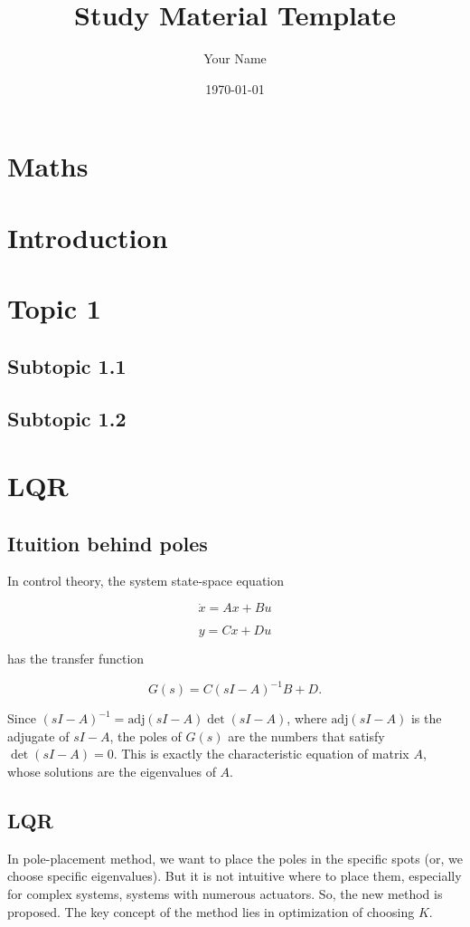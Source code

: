 \documentclass{article}
\title{Study Material Template}
\author{Your Name}
\date{\today}
\begin{document}
\maketitle

\tableofcontents
\newpage


\section{Maths}

\section{Introduction}

\section{Topic 1}
\subsection{Subtopic 1.1}

\subsection{Subtopic 1.2}

\section{LQR}

\subsection{Ituition behind poles}
In control theory, the system state-space equation

\[\dot{x} = Ax+Bu\]

\[y=Cx+Du\]

has the transfer function

\[G(s)=C(sI-A)^{-1}B+D.\]

Since \((sI-A)^{-1}=\text{adj}(sI-A)\det(sI-A)\), where \(\text{adj}(sI-A)\) is the adjugate of \(sI-A\), the poles of \(G(s)\) are the numbers that satisfy \(\det(sI-A)=0\). This is exactly the characteristic equation of matrix \(A\), whose solutions are the eigenvalues of \(A\).

\subsection{LQR}
In pole-placement method, we want to place the poles in the specific spots (or, we choose specific eigenvalues). But it is not intuitive where to place them, especially for complex systems, systems with numerous actuators.
So, the new method is proposed. The key concept of the method lies in optimization of choosing \(K\). 
\end{document}
